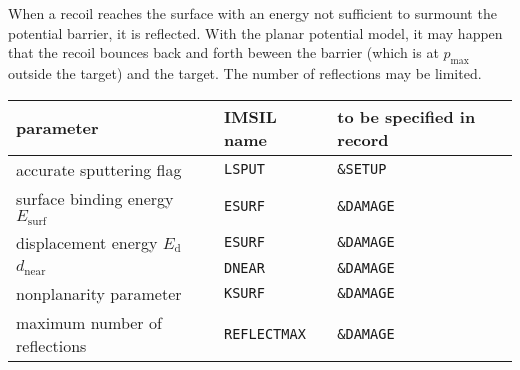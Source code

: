 When a recoil reaches the surface with an energy not sufficient to surmount the
potential barrier, it is reflected. With the planar potential model, it may
happen that the recoil bounces back and forth beween the barrier (which is
at $p_\mathrm{max}$ outside the target) and the target. The number of
reflections may be limited.

\begin{center}
\begin{tabular}{lll}
   parameter \quad          & IMSIL name & to be specified in record \\
   \hline
   accurate sputtering flag                 & {\tt LSPUT}   & {\tt \&SETUP} \\
   surface binding energy $E_\mathrm{surf}$ & {\tt ESURF}   & {\tt \&DAMAGE} \\
   displacement energy $E_\mathrm{d}$       & {\tt ESURF}   & {\tt \&DAMAGE} \\
   $d_\mathrm{near}$                        & {\tt DNEAR}   & {\tt \&DAMAGE} \\
   nonplanarity parameter                   & {\tt KSURF}   & {\tt \&DAMAGE} \\
   maximum number of reflections         & {\tt REFLECTMAX} & {\tt \&DAMAGE} \\
\end{tabular}
\end{center}

